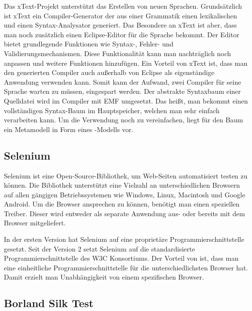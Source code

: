 Das xText-Projekt \cite{xtext} unterstützt das Erstellen von neuen Sprachen. Grundsätzlich ist xText ein Compiler-Generator der aus einer Grammatik einen lexikalischen und einen Syntax-Analysator generiert. Das Besondere an xText ist aber, dass man noch zusätzlich einen Eclipse-Editor für die Sprache bekommt. Der Editor bietet grundlegende Funktionen wie Syntax-, Fehler- und Validierungsmechanismen. Diese Funktionalität kann man nachträglich noch anpassen und weitere Funktionen hinzufügen. Ein Vorteil von xText ist, dass man den generierten Compiler auch außerhalb von Eclipse als eigenständige Anwendung verwenden kann. Somit kann der Aufwand, zwei Compiler für seine Sprache warten zu müssen, eingespart werden. Der abstrakte Syntaxbaum einer Quelldatei wird im Compiler mit EMF umgesetzt. Das heißt, man bekommt einen vollständigen Syntax-Baum im Hauptspeicher, welchen man sehr einfach verarbeiten kann. Um die Verwendung noch zu vereinfachen, liegt für den Baum ein Metamodell in Form eines -Modells vor. 

\subsection{Selenium}

Selenium \cite{Selenium} ist eine Open-Source-Bibliothek, um Web-Seiten automatisiert testen zu können. Die Bibliothek unterstützt eine Vielzahl an unterschiedlichen Browsern auf allen gängigen Betriebssystemen wie Windows, Linux, Macintosh und Google Android. Um die Browser ansprechen zu können, benötigt man einen speziellen Treiber. Dieser wird entweder als separate Anwendung aus- oder bereits mit dem Browser mitgeliefert.

\SuperPar
In der ersten Version hat Selenium auf eine proprietäre Programmierschnittstelle gesetzt. Seit der Version 2 setzt Selenium auf die standardisierte Programmierschnittstelle  \cite{WebDriver} des W3C Konsortiums. Der Vorteil von  ist, dass man eine einheitliche Programmierschnittstelle für die unterschiedlichsten Browser hat. Damit erzielt man Unabhängigkeit von einem spezifischen Browser. 

\subsection{Borland Silk Test}

